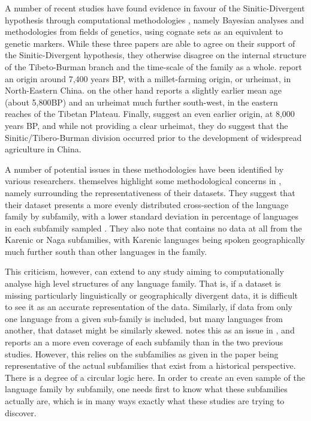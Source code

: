 A number of recent studies have found evidence in favour of the Sinitic-Divergent hypothesis through computational methodologies \cites{ZhangM2019Baye}{ZhangH2020Baye}{Sagart2019Baye}, namely Bayesian analyses and methodologies from fields of genetics, using cognate sets as an equivalent to genetic markers. While these three papers are able to agree on their support of the Sinitic-Divergent hypothesis, they otherwise disagree on the internal structure of the Tibeto-Burman branch and the time-scale of the family as a whole.  report an origin around 7,400 years BP, with a millet-farming origin, or urheimat, in North-Eastern China.  on the other hand reports a slightly earlier mean age (about 5,800BP) and an urheimat much further south-west, in the eastern reaches of the Tibetan Plateau. Finally,   suggest an even earlier origin, at 8,000 years BP, and while not providing a clear urheimat, they do suggest that the Sinitic/Tibero-Burman division occurred prior to the development of widespread agriculture in China.

A number of potential issues in these methodologies have been identified by various researchers.  themselves highlight some methodological concerns in , namely surrounding the representativeness of their datasets. They suggest that their dataset presents a more evenly distributed cross-section of the language family by subfamily, with a lower standard deviation in percentage of languages in each subfamily sampled \cite{ZhangH2020Baye}. They also note that  contains no data at all from the Karenic or Naga subfamilies, with Karenic languages being spoken geographically much further south than other languages in the family.

This criticism, however, can extend to any study aiming to computationally analyse high level structures of any language family. That is, if a dataset is missing particularly linguistically or geographically divergent data, it is difficult to see it as an accurate representation of the data. Similarly, if data from only one language from a given sub-family is included, but many languages from another, that dataset might be similarly skewed.  notes this as an issue in , and reports an a more even coverage of each subfamily than in the two previous studies. However, this relies on the subfamilies as given in the paper being representative of the actual subfamilies that exist from a historical perspective. There is a degree of a circular logic here. In order to create an even sample of the language family by subfamily, one needs first to know what these subfamilies actually are, which is in many ways exactly what these studies are trying to discover.

